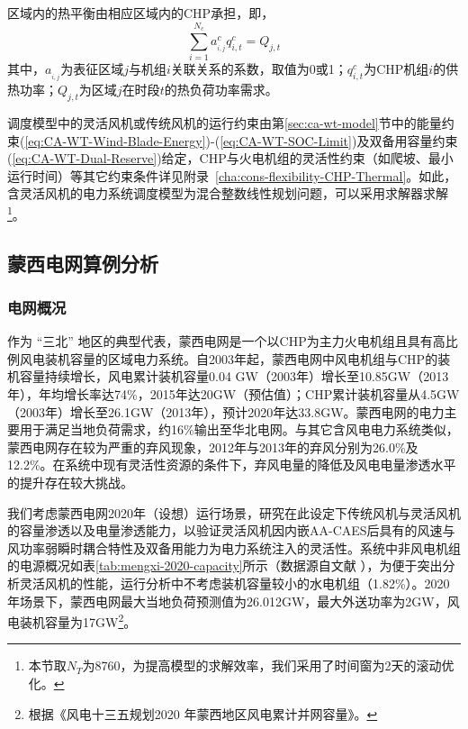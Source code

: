 
区域内的热平衡由相应区域内的CHP承担，即，
\begin{equation}
\sum\limits_{i = 1}^{{N_c}} {a_{_{i,j}}^cq_{i,t}^c}  = {Q_{j,t}}
\end{equation}
其中，$a_{_{i,j}}$为表征区域$j$与机组$i$关联关系的系数，取值为0或1；$q_{i,t}^c$为CHP机组$i$的供热功率；$Q_{j,t}$为区域$j$在时段$t$的热负荷功率需求。

调度模型中的灵活风机或传统风机的运行约束由第\ref{sec:ca-wt-model}节中的能量约束(\ref{eq:CA-WT-Wind-Blade-Energy})-(\ref{eq:CA-WT-SOC-Limit})及双备用容量约束(\ref{eq:CA-WT-Dual-Reserve})给定，CHP与火电机组的灵活性约束（如爬坡、最小运行时间）等其它约束条件详见附录~\ref{cha:cons-flexibility-CHP-Thermal}。如此，含灵活风机的电力系统调度模型为混合整数线性规划问题，可以采用求解器求解\footnote{本节取$N_T$为8760，为提高模型的求解效率，我们采用了时间窗为2天的滚动优化。}。

\subsection{蒙西电网算例分析}

\subsubsection{电网概况}
作为 “三北” 地区的典型代表，蒙西电网是一个以CHP为主力火电机组且具有高比例风电装机容量的区域电力系统。自2003年起，蒙西电网中风电机组与CHP的装机容量持续增长，风电累计装机容量0.04 GW（2003年）增长至10.85GW（2013年），年均增长率达74\%，2015年达20GW（预估值）\cite{Jinlin-Curtail-16}；CHP累计装机容量从4.5GW（2003年）增长至26.1GW（2013年），预计2020年达33.8GW\cite{Jinlin-Curtail-16}。蒙西电网的电力主要用于满足当地负荷需求，约16\%输出至华北电网。与其它含风电电力系统类似，蒙西电网存在较为严重的弃风现象，2012年与2013年的弃风分别为26.0\%及12.2\%。在系统中现有灵活性资源的条件下，弃风电量的降低及风电电量渗透水平的提升存在较大挑战。

我们考虑蒙西电网2020年（设想）运行场景，研究在此设定下传统风机与灵活风机的容量渗透以及电量渗透能力，以验证灵活风机因内嵌AA-CAES后具有的风速与风功率弱瞬时耦合特性及双备用能力为电力系统注入的灵活性。系统中非风电机组的电源概况如表\ref{tab:mengxi-2020-capacity}所示（数据源自文献
），为便于突出分析灵活风机的性能，运行分析中不考虑装机容量较小的水电机组（1.82\%）。2020 年场景下，蒙西电网最大当地负荷预测值为26.012GW，最大外送功率为2GW，风电装机容量为17GW\footnote{根据《风电十三五规划2020 年蒙西地区风电累计并网容量》。}。

